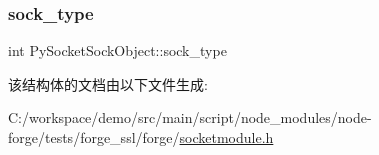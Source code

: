 \mbox{\label{struct_py_socket_sock_object_a396c2c7cc92df8e9c16edc9a0268ca10}} 
\subsubsection{\texorpdfstring{sock\+\_\+type}{sock\_type}}
{\footnotesize\ttfamily int Py\+Socket\+Sock\+Object\+::sock\+\_\+type}



该结构体的文档由以下文件生成\+:\begin{DoxyCompactItemize}
\item 
C\+:/workspace/demo/src/main/script/node\+\_\+modules/node-\/forge/tests/forge\+\_\+ssl/forge/\mbox{\hyperlink{socketmodule_8h}{socketmodule.\+h}}\end{DoxyCompactItemize}
